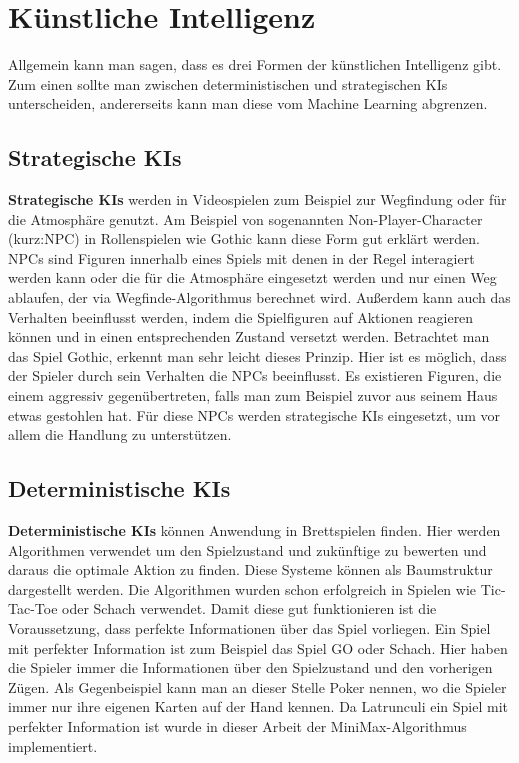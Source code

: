 \section{Künstliche Intelligenz}
\label{ch:Grundlagen:sec:Künstliche Intelligenz}
Allgemein kann man sagen, dass es drei Formen der künstlichen Intelligenz gibt. Zum einen sollte man zwischen deterministischen und strategischen KIs unterscheiden, andererseits kann man diese vom Machine Learning abgrenzen.

\subsection{Strategische KIs}
\label{ch:Grundlagen:sec:strategisch}
\textbf{Strategische KIs} werden in Videospielen zum Beispiel zur Wegfindung oder für die Atmosphäre genutzt. Am Beispiel von sogenannten Non-Player-Character (kurz:NPC) in Rollenspielen wie Gothic kann diese Form  gut erklärt werden. NPCs sind Figuren innerhalb eines Spiels mit denen in der Regel interagiert werden kann oder die für die Atmosphäre eingesetzt werden und nur einen Weg ablaufen, der via Wegfinde-Algorithmus berechnet wird. Außerdem kann auch das Verhalten beeinflusst werden, indem die Spielfiguren auf Aktionen reagieren können und in einen entsprechenden Zustand versetzt werden. Betrachtet man das Spiel Gothic, erkennt man sehr leicht dieses Prinzip. Hier ist es möglich, dass der Spieler durch sein Verhalten die NPCs beeinflusst. Es existieren Figuren, die einem aggressiv gegenübertreten, falls man zum Beispiel zuvor aus seinem Haus etwas gestohlen hat. Für diese NPCs werden strategische KIs eingesetzt, um vor allem die Handlung zu unterstützen.

\subsection{Deterministische KIs}
\label{ch:Grundlagen:sec:deterministisch}
\textbf{Deterministische KIs} können Anwendung in Brettspielen finden. Hier werden Algorithmen verwendet um den Spielzustand und zukünftige zu bewerten und daraus die optimale Aktion zu finden. Diese Systeme können als Baumstruktur dargestellt werden. Die Algorithmen wurden schon erfolgreich in Spielen wie Tic-Tac-Toe oder Schach\cite{yannakakis2018artificial} verwendet. Damit diese gut funktionieren ist die Voraussetzung, dass perfekte Informationen über das Spiel vorliegen. Ein Spiel mit perfekter Information ist zum Beispiel das Spiel GO oder Schach. Hier haben die Spieler immer die Informationen über den Spielzustand und den vorherigen Zügen. Als Gegenbeispiel kann man an dieser Stelle Poker nennen, wo die Spieler immer nur ihre eigenen Karten auf der Hand kennen. Da Latrunculi ein Spiel mit perfekter Information ist wurde in dieser Arbeit der MiniMax-Algorithmus implementiert.

